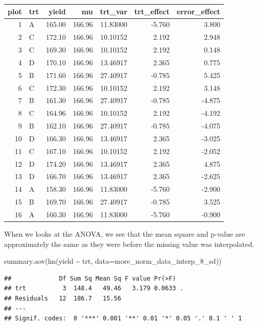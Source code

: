 \documentclass[
]{book}
\newenvironment{Shaded}{\begin{snugshade}}{\end{snugshade}}
\newcommand{\AttributeTok}[1]{\textcolor[rgb]{0.77,0.63,0.00}{#1}}
\newcommand{\FunctionTok}[1]{\textcolor[rgb]{0.00,0.00,0.00}{#1}}
\newcommand{\NormalTok}[1]{#1}
\newcommand{\SpecialCharTok}[1]{\textcolor[rgb]{0.00,0.00,0.00}{#1}}
\begin{document}
\begin{tabular}{r|l|r|r|r|r|r}
\hline
plot & trt & yield & mu & trt\_var & trt\_effect & error\_effect\\
\hline
1 & A & 165.00 & 166.96 & 11.83000 & -5.760 & 3.800\\
\hline
2 & C & 172.10 & 166.96 & 10.10152 & 2.192 & 2.948\\
\hline
3 & C & 169.30 & 166.96 & 10.10152 & 2.192 & 0.148\\
\hline
4 & D & 170.10 & 166.96 & 13.46917 & 2.365 & 0.775\\
\hline
5 & B & 171.60 & 166.96 & 27.40917 & -0.785 & 5.425\\
\hline
6 & C & 172.30 & 166.96 & 10.10152 & 2.192 & 3.148\\
\hline
7 & B & 161.30 & 166.96 & 27.40917 & -0.785 & -4.875\\
\hline
8 & C & 164.96 & 166.96 & 10.10152 & 2.192 & -4.192\\
\hline
9 & B & 162.10 & 166.96 & 27.40917 & -0.785 & -4.075\\
\hline
10 & D & 166.30 & 166.96 & 13.46917 & 2.365 & -3.025\\
\hline
11 & C & 167.10 & 166.96 & 10.10152 & 2.192 & -2.052\\
\hline
12 & D & 174.20 & 166.96 & 13.46917 & 2.365 & 4.875\\
\hline
13 & D & 166.70 & 166.96 & 13.46917 & 2.365 & -2.625\\
\hline
14 & A & 158.30 & 166.96 & 11.83000 & -5.760 & -2.900\\
\hline
15 & B & 169.70 & 166.96 & 27.40917 & -0.785 & 3.525\\
\hline
16 & A & 160.30 & 166.96 & 11.83000 & -5.760 & -0.900\\
\hline
\end{tabular}

When we looks at the ANOVA, we see that the mean square and p-value are approximately the same as they were before the missing value was interpolated.

\begin{Shaded}
\begin{Highlighting}[]
\FunctionTok{summary.aov}\NormalTok{(}\FunctionTok{lm}\NormalTok{(yield }\SpecialCharTok{\textasciitilde{}}\NormalTok{ trt, }\AttributeTok{data=}\NormalTok{more\_norm\_data\_interp\_8\_sd))}
\end{Highlighting}
\end{Shaded}

\begin{verbatim}
##             Df Sum Sq Mean Sq F value Pr(>F)  
## trt          3  148.4   49.46   3.179 0.0633 .
## Residuals   12  186.7   15.56                 
## ---
## Signif. codes:  0 '***' 0.001 '**' 0.01 '*' 0.05 '.' 0.1 ' ' 1
\end{verbatim}
\end{document}
